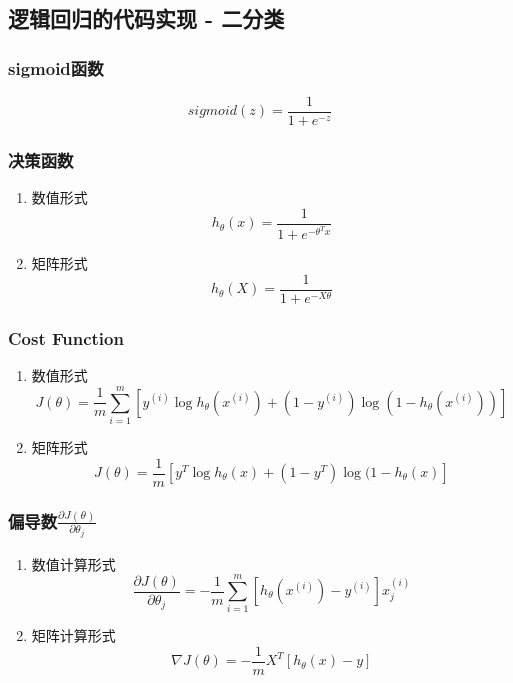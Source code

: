 \subsection{逻辑回归的代码实现 - 二分类}

\subsubsection{sigmoid函数}
\begin{equation}
	sigmoid(z) = \frac{1}{1 + e^{-z}}
\end{equation}


\subsubsection{决策函数}
\begin{enumerate}
\item 数值形式
\begin{equation}
	h_\theta(x) = \frac{1}{1 + e^{-\theta^T x}}
\end{equation}

\item 矩阵形式
\begin{equation}
	h_\theta(X) = \frac{1}{1 + e^{-X \theta}}
\end{equation}
\end{enumerate}


\subsubsection{Cost Function}
\begin{enumerate}
\item 数值形式
\begin{equation}
	J(\theta) = \frac{1}{m}
	    \sum_{i=1}^m \left[ y^{(i)}\log{h_\theta(x^{(i)})} + (1-y^{(i)})\log{(1-h_\theta(x^{(i)}))} \right]
\end{equation}

\item 矩阵形式
\begin{equation}
		J(\theta) = \frac{1}{m} \left[y^T \log{h_\theta(x)} + (1-y^T) \log{(1-h_\theta(x)}\right]
\end{equation}
\end{enumerate}

\subsubsection{偏导数$\frac{\partial J(\theta)}{\partial \theta_j}$}
\begin{enumerate}
\item 数值计算形式
\begin{equation}
	\frac{\partial J(\theta)}{\partial \theta_j} =
	    -\frac{1}{m} \sum_{i=1}^m \left[h_\theta(x^{(i)}) - y^{(i)}\right] x_j^{(i)}
\end{equation}

\item 矩阵计算形式
\begin{equation}
	\nabla J(\theta) = -\frac{1}{m} X^T \left[h_\theta(x) - y\right]
\end{equation}
\end{enumerate}



